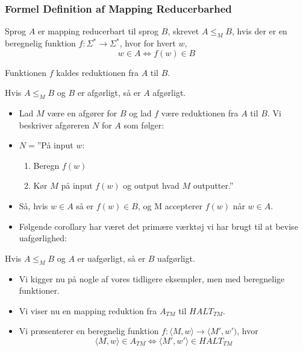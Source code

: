 \begin{frame}[allowframebreaks]
	\frametitle{Formel Definition af Mapping Reducerbarhed}
	\begin{definition}
		Sprog $A$ er mapping reducerbart til sprog $B$, skrevet $A \le_{M} B$, hvis der er en beregnelig funktion $f : \Sigma^{*} \longrightarrow \Sigma^{*}$, hvor for hvert $w$,
		\begin{equation*}
			w \in A \iff f(w) \in B
		\end{equation*}

		Funktionen $f$ kaldes reduktionen fra $A$ til $B$.
	\end{definition}

	\begin{theorem}
		Hvis $A \le_{M} B$ og $B$ er afgørligt, så er $A$ afgørligt.
	\end{theorem}
	\begin{itemize}
		\item Lad $M$ være en afgører for $B$ og lad $f$ være reduktionen fra $A$ til $B$. Vi beskriver afgøreren $N$ for $A$ som følger:
		\item $N =$''På input $w$:
		      \begin{enumerate}
			      \item Beregn $f(w)$
			      \item Kør $M$ på input $f(w)$ og output hvad $M$ outputter.''
		      \end{enumerate}
		\item Så, hvis $w \in A$ så er $f(w) \in B$, og M accepterer $f(w)$ når $w \in A$.
		\item Følgende corollary har været det primære værktøj vi har brugt til at bevise uafgørlighed:
	\end{itemize}

	\begin{corollary}
		Hvis $A \le_{M} B$ og $A$ er uafgørligt, så er $B$ uafgørligt.
	\end{corollary}

	\begin{itemize}
		\item Vi kigger nu på nogle af vores tidligere eksempler, men med beregnelige funktioner.
		\item Vi viser nu en mapping reduktion fra $A_{TM}$ til $HALT_{TM}$.
		\item Vi præsenterer en beregnelig funktion $f : \langle M , w \rangle \rightarrow \langle M ' , w' )$, hvor
		      \begin{equation*}
			      \langle M , w \rangle \in A_{TM} \iff \langle M ', w' \rangle \in HALT_{TM}
		      \end{equation*}


\end{itemize}
\end{frame}
